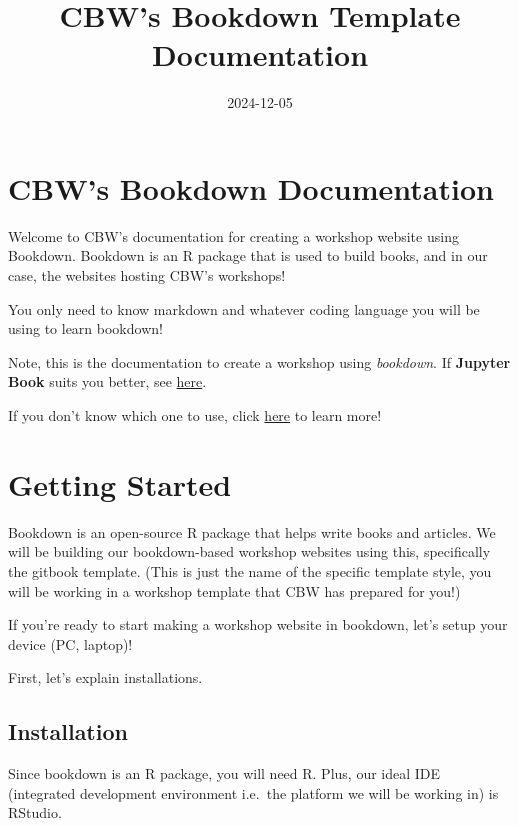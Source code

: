 \documentclass[
]{book}
\title{CBW's Bookdown Template Documentation}
\author{}
\date{\vspace{-2.5em}2024-12-05}
\theoremstyle{definition}
\theoremstyle{definition}
\theoremstyle{definition}
\theoremstyle{definition}
\theoremstyle{remark}
\begin{document}
\maketitle

{
\setcounter{tocdepth}{1}
\tableofcontents
}
\chapter{CBW's Bookdown Documentation}\label{cbws-bookdown-documentation}

Welcome to CBW's documentation for creating a workshop website using Bookdown. Bookdown is an R package that is used to build books, and in our case, the websites hosting CBW's workshops!

You only need to know markdown and whatever coding language you will be using to learn bookdown!

Note, this is the documentation to create a workshop using \emph{bookdown}. If \textbf{Jupyter Book} suits you better, see \href{https://cbw-dev.github.io/jupyterbook-docs/}{here}.

If you don't know which one to use, click \href{}{here} to learn more!

\chapter{Getting Started}\label{getting-started}

Bookdown is an open-source R package that helps write books and articles. We will be building our bookdown-based workshop websites using this, specifically the gitbook template. (This is just the name of the specific template style, you will be working in a workshop template that CBW has prepared for you!)

If you're ready to start making a workshop website in bookdown, let's setup your device (PC, laptop)!

First, let's explain installations.

\section{Installation}\label{installation}

Since bookdown is an R package, you will need R. Plus, our ideal IDE (integrated development environment i.e.~the platform we will be working in) is RStudio.
\end{document}
